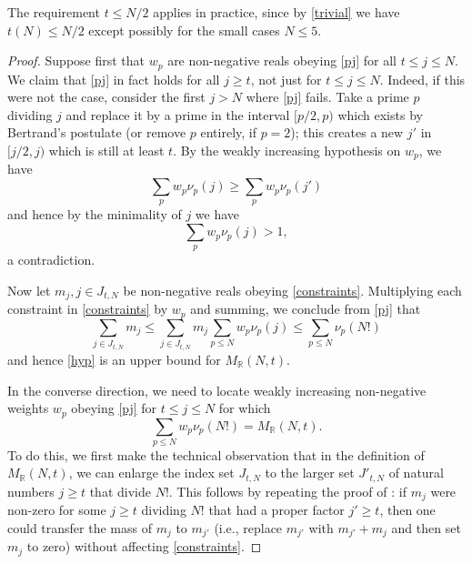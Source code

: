 \documentclass[12pt,a4paper,reqno]{amsart}
\numberwithin{equation}{section}
\theoremstyle{plain}
\theoremstyle{definition}
\newcommand\R{\mathbb{R}}
\begin{document}
The requirement $t \leq N/2$ applies in practice, since by \eqref{trivial} we have $t(N) \leq N/2$ except possibly for the small cases $N \leq 5$.

\begin{proof}  Suppose first that $w_p$ are non-negative reals obeying \eqref{pj} for all $t \leq j \leq N$.
We claim that \eqref{pj} in fact holds for all $j \geq t$, not just for $t \leq j \leq N$.  Indeed, if this were not the case, consider the first $j > N$ where \eqref{pj} fails.  Take a prime $p$ dividing $j$ and replace it by a prime in the interval $[p/2,p)$ which exists by Bertrand's postulate (or remove $p$ entirely, if $p=2$); this creates a new $j'$ in $[j/2,j)$ which is still at least $t$.  By the weakly increasing hypothesis on $w_p$, we have
  $$ \sum_p w_p \nu_p(j) \geq \sum_p w_p \nu_p(j')$$
  and hence by the minimality of $j$ we have
  $$ \sum_p w_p \nu_p(j) > 1,$$
  a contradiction.

Now let $m_j, j \in J_{t,N}$ be non-negative reals obeying \eqref{constraints}.  Multiplying each constraint in \eqref{constraints} by $w_p$ and summing, we conclude from \eqref{pj} that
$$ \sum_{j \in J_{t,N}} m_j  \leq \sum_{j \in J_{t,N}} m_j \sum_{p \leq N} w_p \nu_p(j) \leq \sum_{p \leq N} \nu_p(N!)$$
and hence \eqref{hyp} is an upper bound for $M_\R(N,t)$.

In the converse direction, we need to locate weakly increasing non-negative weights $w_p$ obeying \eqref{pj} for $t \leq j \leq N$ for which
\begin{equation}\label{wpm} 
  \sum_{p \leq N} w_p \nu_p(N!) = M_\R(N,t).
\end{equation}
To do this, we first make the technical observation that in the definition of $M_\R(N,t)$, we can enlarge the index set $J_{t,N}$ to the larger set $J'_{t,N}$ of natural numbers $j \geq t$ that divide $N!$.  This follows by repeating the proof of : if $m_j$ were non-zero for some $j \geq t$ dividing $N!$ that had a proper factor $j' \geq t$, then one could transfer the mass of $m_j$ to $m_{j'}$ (i.e., replace $m_{j'}$ with $m_{j'}+m_j$ and then set $m_j$ to zero) without affecting \eqref{constraints}.  


\end{proof}
\end{document}
